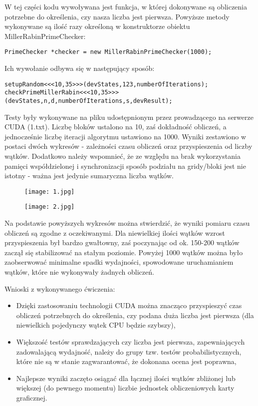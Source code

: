 \documentclass[a4paper,12pt]{article}
\newenvironment{lista}{
\begin{itemize}
  \setlength{\itemsep}{1pt}
  \setlength{\parskip}{0pt}
  \setlength{\parsep}{0pt}
}{\end{itemize}}
\begin{document}
W tej części kodu wywoływana jest funkcja, w której dokonywane są obliczenia potrzebne do określenia, czy nasza liczba jest pierwsza. Powyższe metody wykonywane są ilość razy określoną w konstruktorze obiektu MillerRabinPrimeChecker:

\begin{lstlisting}
PrimeChecker *checker = new MillerRabinPrimeChecker(1000);
\end{lstlisting}

Ich wywołanie odbywa się w następujący sposób:

\begin{lstlisting}
setupRandom<<<10,35>>>(devStates,123,numberOfIterations);
checkPrimeMillerRabin<<<10,35>>>(devStates,n,d,numberOfIterations,s,devResult);
\end{lstlisting}

Testy były wykonywane na pliku udostępnionym przez prowadzącego na serwerze CUDA (1.txt). Liczbę bloków ustalono na 10, zaś dokładność obliczeń, a jednocześnie liczbę iteracji algorytmu ustawiono na 1000. Wyniki zestawiono w postaci dwóch wykresów - zależności czasu obliczeń oraz przyspieszenia od liczby wątków. Dodatkowo należy wspomnieć, że ze względu na brak wykorzystania pamięci współdzielonej i synchronizacji sposób podziału na gridy/bloki jest nie istotny - ważna jest jedynie sumaryczna liczba wątków.

\begin{figure}[!h]
	\centering
  \texttt{[image: 1.jpg]}
\end{figure}

\begin{figure}[!h]
	\centering
  \texttt{[image: 2.jpg]}
\end{figure}

Na podstawie powyższych wykresów można stwierdzić, że wyniki pomiaru czasu obliczeń są zgodne z oczekiwanymi. Dla niewielkiej ilości wątków wzrost przyspieszenia był bardzo gwałtowny, zaś poczynając od ok. 150-200 wątków zaczął się stabilizować na stałym poziomie. Powyżej 1000 wątków można było zaobserwować minimalne spadki wydajności, spowodowane uruchamianiem wątków, które nie wykonywały żadnych obliczeń.

Wnioski z wykonywanego ćwiczenia:
\begin{lista}
\item Dzięki zastosowaniu technologii CUDA można znacząco przyspieszyć czas obliczeń potrzebnych do określenia, czy podana duża liczba jest pierwsza (dla niewielkich pojedynczy wątek CPU będzie szybszy),
\item Większość testów sprawdzających czy liczba jest pierwsza, zapewniających zadowalającą wydajność, należy do grupy tzw. testów probabilistycznych, które nie są w stanie zagwarantować, że dokonana ocena jest poprawna, 
\item Najlepsze wyniki zaczęto osiągać dla łącznej ilości wątków zbliżonej lub większej (do pewnego momentu) liczbie jednostek obliczeniowych karty graficznej.
\end{lista}
\end{document}
